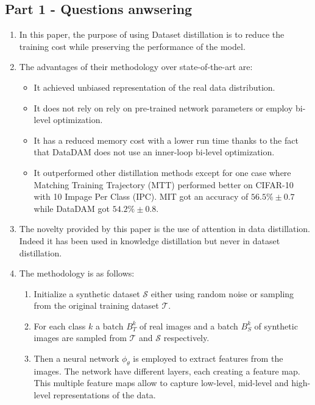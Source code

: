 \documentclass[onecolumn]{IEEEtran}
\begin{document}
\subsection{Part 1 - Questions anwsering}
\begin{enumerate}[label=(\alph*)]
    \item In this paper, the purpose of using Dataset distillation is to reduce the training cost while preserving the performance of the model.
    \vspace{3mm}
    \item The advantages of their methodology over state-of-the-art are:
    \begin{itemize}
        \item It achieved unbiased representation of the real data distribution.
        \item It does not rely on rely on pre-trained network parameters or employ bi-level optimization.
        \item It has a reduced memory cost with a lower run time thanks to the fact that DataDAM does not use an inner-loop bi-level optimization.
        \item It outperformed other distillation methods except for one case where Matching Training Trajectory (MTT) performed better on CIFAR-10 with 10 Impage Per Class (IPC). MIT got an accuracy of $56.5\% \pm 0.7$ while DataDAM got $54.2\% \pm 0.8$.
    \end{itemize}
    \vspace{3mm}
    \item The novelty provided by this paper is the use of attention in data distillation. Indeed it has been used in knowledge distillation but never in dataset distillation.
    \vspace{3mm}
    \item The methodology is as follows:
    \begin{enumerate}[label=(\arabic*)]
        \item Initialize a synthetic dataset $\mathcal{S}$ either using random noise or sampling from the original training dataset $\mathcal{T}$.
        \item For each class $k$ a batch $B_T^k$ of real images and a batch $B_S^k$ of synthetic images are sampled from $\mathcal{T}$ and $\mathcal{S}$ respectively.
        \item Then a neural network $\phi_\theta$ is employed to extract features from the images. The network have different layers, each creating a feature map. This multiple feature maps allow to capture low-level, mid-level and high-level representations of the data.

\end{enumerate}
\end{enumerate}
\end{document}
